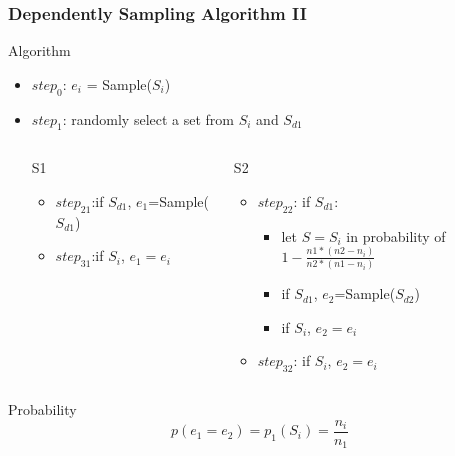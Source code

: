 \documentclass[notheorems, aspectratio=54]{beamer}
\begin{document}
\begin{frame}
    \frametitle{Dependently Sampling Algorithm II}
    \begin{block}{Algorithm}

        \begin{itemize}
            \item $step_{0}$: $e_i$ = Sample($S_i$)
            \item $step_{1}$: randomly select a set from $S_i$ and $S_{d1}$
            \begin{columns}
                \begin{column}{0.48\textwidth}
                    \begin{alertblock}{S1}
                        \begin{itemize}
                            \item $step_{21}$:if $S_{d1}$, $e_1$=Sample($S_{d1}$)
                            \item $step_{31}$:if $S_i$, $e_1 = e_i$
                        \end{itemize}
                    \end{alertblock}
                    \end{column}
                    \begin{column}{0.48\textwidth}
                    \begin{alertblock}{S2}
                        \begin{itemize}
                            \item $step_{22}$: if $S_{d1}$:
                            \begin{itemize}
                                \item let $S = S_{i}$ in probability of $1-\frac{n1*(n2-n_i)}{n2*(n1-n_i)}$
                                \item if $S_{d1}$, $e_2$=Sample($S_{d2}$)
                                \item if $S_i$, $e_2 = e_i$
                            \end{itemize}
                            \item $step_{32}$: if $S_i$, $e_2 = e_i$
                        \end{itemize}
                    \end{alertblock}
                \end{column}
            \end{columns}
        \end{itemize}
    \end{block}
    \begin{block}{Probability}
        $$
            p(e_1 = e_2) = p_1(S_i) = \frac{n_i}{n_1}
        $$
    \end{block}
\end{frame}
\end{document}
